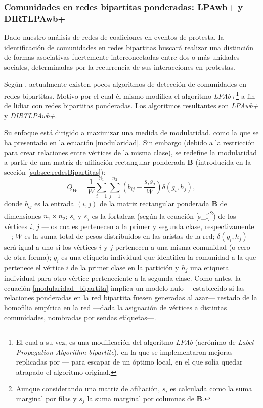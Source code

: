 \documentclass[letterpaper, 11pt]{book}
\theoremstyle{definition}
\theoremstyle{remark}
\begin{document}
\subsubsection{Comunidades en redes bipartitas ponderadas: LPAwb+ y DIRTLPAwb+}
\label{sec:DIRTLPAwb+}

Dado nuestro análisis de redes de coaliciones en eventos de protesta, la identificación de comunidades en redes bipartitas buscará realizar una distinción de formas asociativas fuertemente interconectadas entre dos o más unidades sociales, determinadas por la recurrencia de sus interacciones en protestas. 


Según \citet{2016_Beckett_ComunidadesBipatitas}, actualmente existen pocos algoritmos de detección de comunidades en redes bipartitas. 
Motivo por el cual él mismo modifica el algoritmo \emph{LPAb+}\footnote{
    El cual a su vez, es una modificación del algoritmo \emph{LPAb} (acrónimo de \emph{Label Propagation Algorithm bipartite}), en la que se implementaron mejoras ---replicadas por \citet{2016_Beckett_ComunidadesBipatitas}--- para escapar de un óptimo local, en el que solía quedar atrapado el algoritmo original. 
} 
a fin de lidiar con redes bipartitas ponderadas. 
Los algoritmos resultantes son \emph{LPAwb+} y \emph{DIRTLPAwb+}. 


Su enfoque está dirigido a maximizar una medida de modularidad, como la que se ha presentado en la ecuación \ref{modularidad}. 
Sin embargo (debido a la restricción para crear relaciones entre vértices de la misma clase), se redefine la modularidad a partir de una matriz de afiliación rectangular ponderada $\mathbf{B}$ (introducida en la sección \ref{subsec:redesBipartitas}): 
\begin{equation}\label{modularidad_bipartita}
    Q_{W} = \frac{1}{W} \sum_{i=1}^{n_{1}} \sum_{j=1}^{n_{2}} \left( b_{ij} - \frac{s_{i}s_{j}}{W} \right) \delta(g_{i},h_{j}),
\end{equation} 
donde $b_{ij}$ es la entrada $(i,j)$ de la matriz rectangular ponderada $\mathbf{B}$ de dimensiones $n_{1}\times n_{2}$; $s_{i}$ y $s_{j}$ es la fortaleza (según la ecuación \ref{s_i}\footnote{
    Aunque considerando una matriz de afiliación, $s_{i}$ es calculada como la suma marginal por filas y  $s_{j}$ la suma marginal por columnas de $\mathbf{B}$. 
}) de los vértices $i$, $j$ ---los cuales pertenecen a la primer y segunda clase, respectivamente---; $W$ es la suma total de pesos distribuidos en las aristas de la red; $\delta(g_{i},h_{j})$ será igual a uno si los vértices $i$ y $j$ pertenecen a una misma comunidad (o cero de otra forma); $g_{i}$ es una etiqueta individual que identifica la comunidad a la que pertenece el vértice $i$ de la primer clase en la partición y $h_{j}$ una etiqueta individual para otro vértice perteneciente a la segunda clase. 
Como antes, la ecuación \ref{modularidad_bipartita} implica un modelo nulo ---establecido si las relaciones ponderadas en la red bipartita fuesen generadas al azar--- restado de la homofilia empírica en la red ---dada la asignación de vértices a distintas comunidades, nombradas por sendas etiquetas---.
\end{document}
